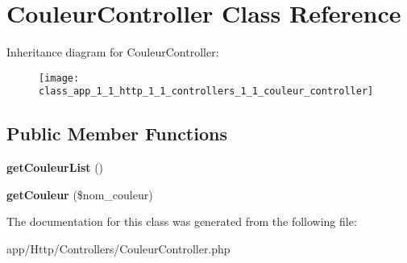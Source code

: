 \hypertarget{class_app_1_1_http_1_1_controllers_1_1_couleur_controller}{}\section{Couleur\+Controller Class Reference}
\label{class_app_1_1_http_1_1_controllers_1_1_couleur_controller}
Inheritance diagram for Couleur\+Controller\+:\begin{figure}[H]
\begin{center}
\leavevmode
\texttt{[image: class\_app\_1\_1\_http\_1\_1\_controllers\_1\_1\_couleur\_controller]}
\end{center}
\end{figure}
\subsection*{Public Member Functions}
\begin{DoxyCompactItemize}
\item 
\mbox{\label{class_app_1_1_http_1_1_controllers_1_1_couleur_controller_a85623a1bf5d68af34c1053ca9e5b7021}} 
{\bfseries get\+Couleur\+List} ()
\item 
\mbox{\label{class_app_1_1_http_1_1_controllers_1_1_couleur_controller_a854934d9ffc15476fa5ce889dd0c7870}} 
{\bfseries get\+Couleur} (\$nom\+\_\+couleur)
\end{DoxyCompactItemize}


The documentation for this class was generated from the following file\+:\begin{DoxyCompactItemize}
\item 
app/\+Http/\+Controllers/Couleur\+Controller.\+php\end{DoxyCompactItemize}
